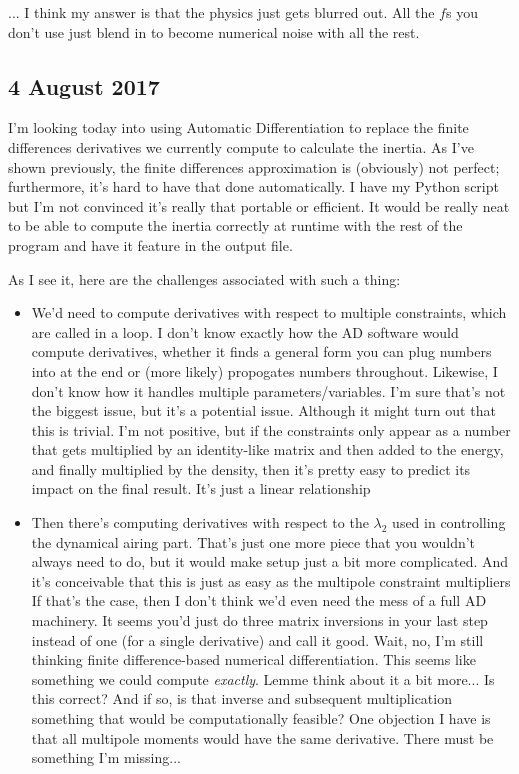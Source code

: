 \documentclass[]{report}
\begin{document}
... I think my answer is that the physics just gets blurred out. All the $f$s you don't use just blend in to become numerical noise with all the rest.

\subsection*{4 August 2017}
I'm looking today into using Automatic Differentiation to replace the finite differences derivatives we currently compute to calculate the inertia. As I've shown previously, the finite differences approximation is (obviously) not perfect; furthermore, it's hard to have that done automatically. I have my Python script but I'm not convinced it's really that portable or efficient. It would be really neat to be able to compute the inertia correctly at runtime with the rest of the program and have it feature in the output file.

As I see it, here are the challenges associated with such a thing:
\begin{itemize}
\item We'd need to compute derivatives with respect to multiple constraints, which are called in a loop. I don't know exactly how the AD software would compute derivatives, whether it finds a general form you can plug numbers into at the end or (more likely) propogates numbers throughout. Likewise, I don't know how it handles multiple parameters/variables. I'm sure that's not the biggest issue, but it's a potential issue.
\subitem Although it might turn out that this is trivial. I'm not positive, but if the constraints only appear as a number that gets multiplied by an identity-like matrix and then added to the energy, and finally multiplied by the density, then it's pretty easy to predict its impact on the final result. It's just a linear relationship
\item Then there's computing derivatives with respect to the $\lambda_2$ used in controlling the dynamical airing part. That's just one more piece that you wouldn't always need to do, but it would make setup just a bit more complicated.
\subitem And it's conceivable that this is just as easy as the multipole constraint multipliers If that's the case, then I don't think we'd even need the mess of a full AD machinery. It seems you'd just do three matrix inversions in your last step instead of one (for a single derivative) and call it good. Wait, no, I'm still thinking finite difference-based numerical differentiation. This seems like something we could compute \textit{exactly}. Lemme think about it a bit more...
\subitem Is this correct? And if so, is that inverse and subsequent multiplication something that would be computationally feasible? One objection I have is that all multipole moments would have the same derivative. There must be something I'm missing...
\end{itemize}
\end{document}
